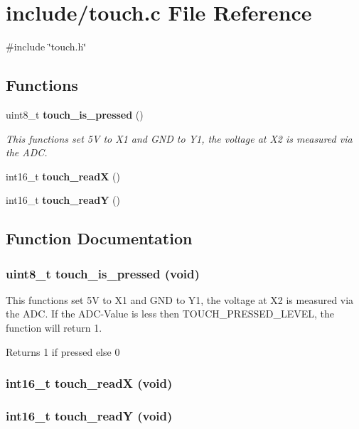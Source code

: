 \section{include/touch.c File Reference}
\label{touch_8c}
{\ttfamily \#include \char`\"{}touch.h\char`\"{}}\par
\subsection*{Functions}
\begin{DoxyCompactItemize}
\item 
uint8\_\-t {\bf touch\_\-is\_\-pressed} ()
\begin{DoxyCompactList}\small\item\em This functions set 5V to X1 and GND to Y1, the voltage at X2 is measured via the ADC. \item\end{DoxyCompactList}\item 
int16\_\-t {\bf touch\_\-readX} ()
\item 
int16\_\-t {\bf touch\_\-readY} ()
\end{DoxyCompactItemize}


\subsection{Function Documentation}
\subsubsection[{touch\_\-is\_\-pressed}]{\setlength{\rightskip}{0pt plus 5cm}uint8\_\-t touch\_\-is\_\-pressed (void)}\label{touch_8c_a215947ded979abf11d490536508ecafc}


This functions set 5V to X1 and GND to Y1, the voltage at X2 is measured via the ADC. If the ADC-\/Value is less then TOUCH\_\-PRESSED\_\-LEVEL, the function will return 1. \begin{DoxyReturn}{Returns}
1 if pressed else 0 
\end{DoxyReturn}
\subsubsection[{touch\_\-readX}]{\setlength{\rightskip}{0pt plus 5cm}int16\_\-t touch\_\-readX (void)}\label{touch_8c_adbea78d45cc89e43f7510ebf6eb01ac0}
\subsubsection[{touch\_\-readY}]{\setlength{\rightskip}{0pt plus 5cm}int16\_\-t touch\_\-readY (void)}\label{touch_8c_acdce8a6997f2d00dbfcb61be2e67e886}
